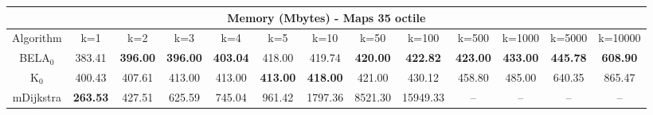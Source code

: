 \begin{tabular}{c|cccccccccccc}\toprule
\multicolumn{13}{c}{Memory (Mbytes) - Maps 35 octile}\\ \midrule
Algorithm & k=1 & k=2 & k=3 & k=4 & k=5 & k=10 & k=50 & k=100 & k=500 & k=1000 & k=5000 & k=10000 \\ \midrule
BELA$_0$ & 383.41 & \textbf{396.00} & \textbf{396.00} & \textbf{403.04} & 418.00 & 419.74 & \textbf{420.00} & \textbf{422.82} & \textbf{423.00} & \textbf{433.00} & \textbf{445.78} & \textbf{608.90} \\
K$_0$ & 400.43 & 407.61 & 413.00 & 413.00 & \textbf{413.00} & \textbf{418.00} & 421.00 & 430.12 & 458.80 & 485.00 & 640.35 & 865.47 \\
mDijkstra & \textbf{263.53} & 427.51 & 625.59 & 745.04 & 961.42 & 1797.36 & 8521.30 & 15949.33 & -- & -- & -- & -- \\ \bottomrule 
\end{tabular}
